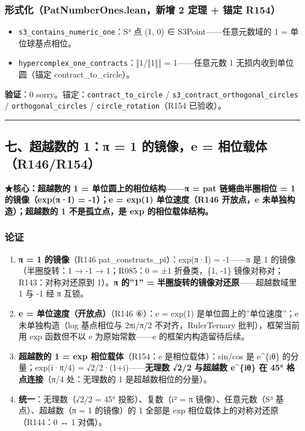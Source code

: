 \documentclass[
]{article}
\providecommand{\tightlist}{%
  \setlength{\itemsep}{0pt}\setlength{\parskip}{0pt}}
\begin{document}
\subsubsection{形式化（PatNumberOnes.lean，新增 2 定理 + 锚定
R154）}\label{ux5f62ux5f0fux5316patnumberones.leanux65b0ux589e-2-ux5b9aux7406-ux951aux5b9a-r154}

\begin{itemize}
\tightlist
\item
  \texttt{s3\_contains\_numeric\_one}：S³ 点 (1, 0) ∈
  S3Point------任意元数域的 1 = 单位球基点相位。
\item
  \texttt{hypercomplex\_one\_contracts}：‖1/‖1‖‖ = 1------任意元数 1
  无损内收到单位圆（锚定 contract\_to\_circle）。
\end{itemize}

\textbf{验证}：0 sorry。锚定：\texttt{contract\_to\_circle} /
\texttt{s3\_contract\_orthogonal\_circles} /
\texttt{orthogonal\_circles} / \texttt{circle\_rotation}（R154
已验收）。

\begin{center}\rule{0.5\linewidth}{0.5pt}\end{center}

\subsection{七、超越数的 1：π = 1 的镜像，e =
相位载体（R146/R154）}\label{ux4e03ux8d85ux8d8aux6570ux7684-1ux3c0-1-ux7684ux955cux50cfe-ux76f8ux4f4dux8f7dux4f53r146r154}

\textbf{★核心：超越数的 1 = 单位圆上的相位结构------π = pat
链蜷曲半圈相位 = 1 的镜像（exp(π·I) = -1）；e = exp(1) 单位速度（R146
开放点，e 未单独构造）；超越数的 1 不是孤立点，是 exp 的相位载体结构。}

\subsubsection{论证}\label{ux8bbaux8bc1-3}

\begin{enumerate}
\def\labelenumi{\arabic{enumi}.}
\tightlist
\item
  \textbf{π = 1 的镜像}（R146 pat\_constructs\_pi）：exp(π·I) =
  -1------π 是 1 的镜像（半圈旋转：1 → -1 → 1；R085：0 = ±1 折叠类，\{1,
  -1\} 镜像对称对；R143：对称对还原到 1）。\textbf{π 的''1'' =
  半圈旋转的镜像对还原}------超越数域里 1 与 -1 经 π 互锁。
\item
  \textbf{e = 单位速度（开放点）}（R146 ⑥）：e = exp(1)
  是单位圆上的''单位速度''；e 未单独构造（log 基点相位与 2πi/π/2
  不对齐，RulerTernary 批判），框架当前用 exp 函数但不以 e
  为原始常数------e 的框架内构造留待后续。
\item
  \textbf{超越数的 1 = exp 相位载体}（R154：e 是相位载体）：sin/cos 是
  e\^{}\{iθ\} 的分量；exp(i·π/4) = √2/2·(1+i)------\textbf{无理数 √2/2
  与超越数 e\^{}\{iθ\} 在 45° 格点连接}（π/4 处：无理数的 1
  是超越数相位的分量）。
\item
  \textbf{统一}：无理数（√2/2 = 45° 投影）、复数（i² = π
  镜像）、任意元数（S³ 基点）、超越数（π = 1 的镜像）的 1 全部是 exp
  相位载体上的对称对还原（R144：0 ↔ 1 对偶）。
\end{enumerate}
\end{document}
